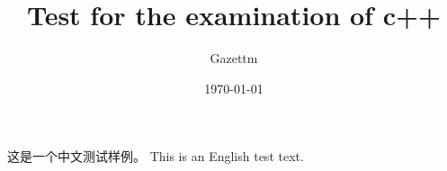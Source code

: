 \documentclass[UTF8]{ctexart}
\title{Test for the examination of c++}
\author{Gazettm}
\date{\today}
\begin{document}
\maketitle

这是一个中文测试样例。
This is an English test text.
\end{document}
